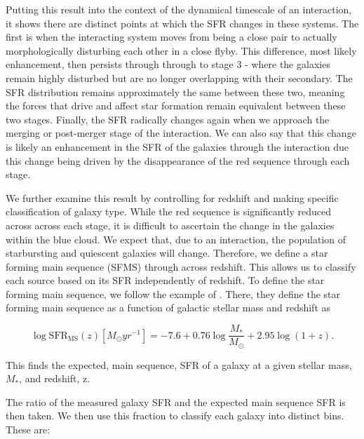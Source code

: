 Putting this result into the context of the dynamical timescale of an interaction, it shows there are distinct points at which the SFR changes in these systems. The first is when the interacting system moves from being a close pair to actually morphologically disturbing each other in a close flyby. This difference, most likely enhancement, then persists through through to stage 3 - where the galaxies remain highly disturbed but are no longer overlapping with their secondary. The SFR distribution remains approximately the same between these two, meaning the forces that drive and affect star formation remain equivalent between these two stages. Finally, the SFR radically changes again when we approach the merging or post-merger stage of the interaction. We can also say that this change is likely an enhancement in the SFR of the galaxies through the interaction due this change being driven by the disappearance of the red sequence through each stage.

We further examine this result by controlling for redshift and making specific classification of galaxy type. While the red sequence is significantly reduced across across each stage, it is difficult to ascertain the change in the galaxies within the blue cloud. We expect that, due to an interaction, the population of starbursting and quiescent galaxies will change. Therefore, we define a star forming main sequence (SFMS) through across redshift. This allows us to classify each source based on its SFR independently of redshift. To define the star forming main sequence, we follow the example of \citet{2019MNRAS.484.4360A}. There, they define the star forming main sequence as a function of galactic stellar mass and redshift as

\begin{equation}
    \log \text{SFR}_{\text{MS}}(z)[M_\odot yr^{-1}] = -7.6 + 0.76\log\frac{M_*}{M_\odot} + 2.95\log(1+z).
\end{equation}

\noindent This finds the expected, main sequence, SFR of a galaxy at a given stellar mass, $M_*$, and redshift, z.

The ratio of the measured galaxy SFR and the expected main sequence SFR is then taken. We then use this fraction to classify each galaxy into distinct bins. These are:

